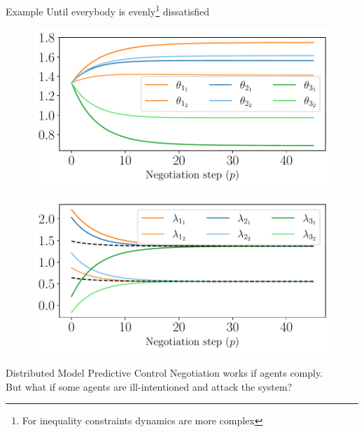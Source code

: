 \documentclass[aspectratio=169]{beamer}
\begin{document}
\begin{frame}{Example}
  \centering
  Until everybody is evenly\footnote{For inequality constraints dynamics are more complex} dissatisfied
  \vspace{1cm}

  \begin{minipage}{0.45\textwidth}
    \begin{figure}
      \includegraphics[width=\textwidth]{../img/example_primal_decomposition/example_theta.pdf}
    \end{figure}
  \end{minipage}
  \hfill
  \begin{minipage}{0.45\textwidth}
    \begin{figure}
      \centering
      \includegraphics[width=\textwidth]{../img/example_primal_decomposition/example_lambda.pdf}
    \end{figure}
  \end{minipage}
\end{frame}

\begin{frame}{Distributed Model Predictive Control}
  Negotiation works if agents comply.\\\pause
  But what if some agents are ill-intentioned and attack the system?

\end{frame}
\end{document}
